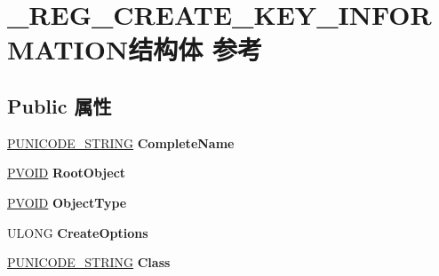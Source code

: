 \hypertarget{struct___r_e_g___c_r_e_a_t_e___k_e_y___i_n_f_o_r_m_a_t_i_o_n}{}\section{\+\_\+\+R\+E\+G\+\_\+\+C\+R\+E\+A\+T\+E\+\_\+\+K\+E\+Y\+\_\+\+I\+N\+F\+O\+R\+M\+A\+T\+I\+O\+N结构体 参考}
\label{struct___r_e_g___c_r_e_a_t_e___k_e_y___i_n_f_o_r_m_a_t_i_o_n}
\subsection*{Public 属性}
\begin{DoxyCompactItemize}
\item 
\mbox{\label{struct___r_e_g___c_r_e_a_t_e___k_e_y___i_n_f_o_r_m_a_t_i_o_n_af4ac557355031d3657e31a0e56954ab9}} 
\hyperlink{struct___u_n_i_c_o_d_e___s_t_r_i_n_g}{P\+U\+N\+I\+C\+O\+D\+E\+\_\+\+S\+T\+R\+I\+NG} {\bfseries Complete\+Name}
\item 
\mbox{\label{struct___r_e_g___c_r_e_a_t_e___k_e_y___i_n_f_o_r_m_a_t_i_o_n_a2a616dbb3b54fa27420a6d8281e2c1e4}} 
\hyperlink{interfacevoid}{P\+V\+O\+ID} {\bfseries Root\+Object}
\item 
\mbox{\label{struct___r_e_g___c_r_e_a_t_e___k_e_y___i_n_f_o_r_m_a_t_i_o_n_ab80f4e2468cb3b25cdda34fb866700cb}} 
\hyperlink{interfacevoid}{P\+V\+O\+ID} {\bfseries Object\+Type}
\item 
\mbox{\label{struct___r_e_g___c_r_e_a_t_e___k_e_y___i_n_f_o_r_m_a_t_i_o_n_af66fd7852c156366ac278922303671a9}} 
U\+L\+O\+NG {\bfseries Create\+Options}
\item 
\mbox{\label{struct___r_e_g___c_r_e_a_t_e___k_e_y___i_n_f_o_r_m_a_t_i_o_n_ac66125554cfbedf95a1143970b5da7e3}} 
\hyperlink{struct___u_n_i_c_o_d_e___s_t_r_i_n_g}{P\+U\+N\+I\+C\+O\+D\+E\+\_\+\+S\+T\+R\+I\+NG} {\bfseries Class}
\item 

\end{DoxyCompactItemize}
